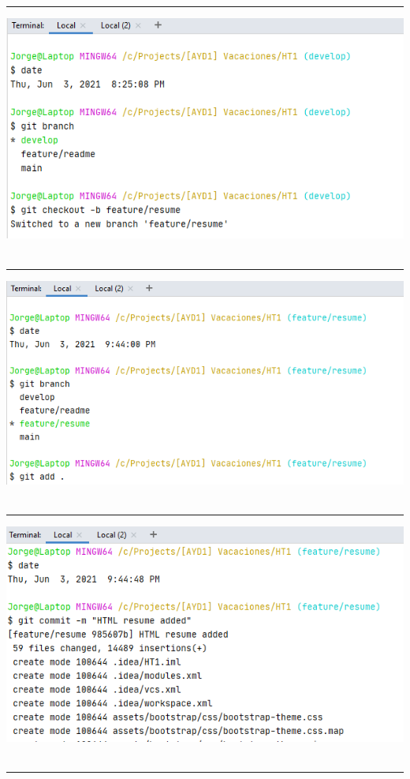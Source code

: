 \documentclass[12pt,letterpaper]{article}
\begin{document}
	\hrule
	\vspace{1cm}
	\includegraphics{4.PNG} \\\\
	\hrule
	\vspace{1cm}
	\includegraphics{5.PNG} \\\\
	\hrule 
	\vspace{1cm}
	\includegraphics{6.PNG} \\\\
	\hrule 
	\vspace{1cm}
\end{document}
